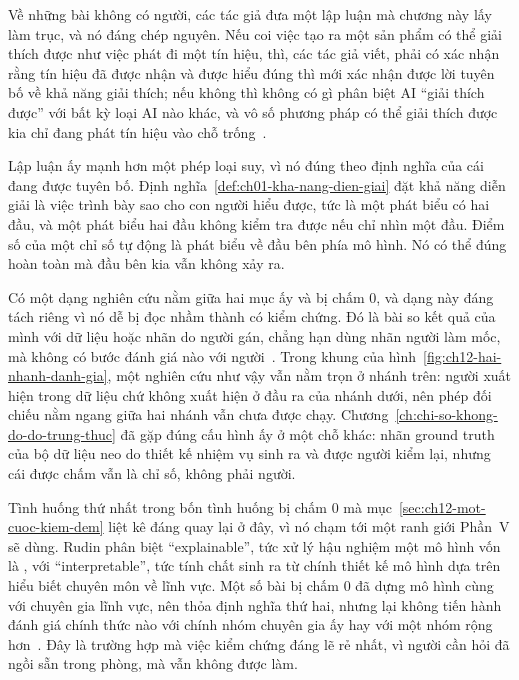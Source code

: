 %
Về những bài không có người, các tác giả đưa một lập luận mà chương này lấy
làm trục, và nó đáng chép nguyên. Nếu coi việc tạo ra một sản phẩm có thể giải
thích được như việc phát đi một tín hiệu, thì, các tác giả viết, phải có
xác nhận rằng tín hiệu đã được nhận và được hiểu đúng thì mới xác nhận được
lời tuyên bố về khả năng giải thích; nếu không thì không có gì phân biệt AI
\enquote{giải thích được} với bất kỳ loại AI nào khác, và vô số phương pháp có
thể giải thích được kia chỉ đang phát tín hiệu vào chỗ
trống~\autocite{p24humangap}.

Lập luận ấy mạnh hơn một phép loại suy, vì nó đúng theo định nghĩa của cái
đang được tuyên bố. Định nghĩa~\ref{def:ch01-kha-nang-dien-giai} đặt khả năng
diễn giải là việc trình bày sao cho con người hiểu được, tức là một phát biểu
có hai đầu, và một phát biểu hai đầu không kiểm tra được nếu chỉ nhìn một đầu.
Điểm số của một chỉ số tự động là phát biểu về đầu bên phía mô hình. Nó có thể
đúng hoàn toàn mà đầu bên kia vẫn không xảy ra.

%
Có một dạng nghiên cứu nằm giữa hai mục ấy và bị chấm 0, và dạng này đáng tách
riêng vì nó dễ bị đọc nhầm thành có kiểm chứng. Đó là bài so kết quả của mình
với dữ liệu hoặc nhãn do người gán, chẳng hạn dùng nhãn người làm mốc, mà
không có bước đánh giá nào với người~\autocite{p24humangap}. Trong khung của
hình~\ref{fig:ch12-hai-nhanh-danh-gia}, một nghiên cứu như vậy vẫn nằm trọn ở
nhánh trên: người xuất hiện trong dữ liệu chứ không xuất hiện ở đầu ra của
nhánh dưới, nên phép đối chiếu nằm ngang giữa hai nhánh vẫn chưa được chạy.
Chương~\ref{ch:chi-so-khong-do-do-trung-thuc} đã gặp đúng cấu hình ấy ở một
chỗ khác: nhãn ground truth của bộ dữ liệu neo do thiết kế nhiệm vụ sinh ra và
được người kiểm lại, nhưng cái được chấm vẫn là chỉ số, không phải người.

Tình huống thứ nhất trong bốn tình huống bị chấm 0 mà
mục~\ref{sec:ch12-mot-cuoc-kiem-dem} liệt kê đáng quay lại ở đây, vì nó chạm
tới một ranh giới Phần~V sẽ dùng. Rudin phân biệt \enquote{explainable}, tức xử lý hậu
nghiệm một mô hình vốn là , với \enquote{interpretable},
tức tính chất sinh ra từ chính thiết kế mô hình dựa trên hiểu biết chuyên môn
về lĩnh vực. Một số bài bị chấm 0 đã dựng mô hình cùng với chuyên gia lĩnh
vực, nên thỏa định nghĩa thứ hai, nhưng lại không tiến hành đánh giá chính
thức nào với chính nhóm chuyên gia ấy hay với một nhóm rộng
hơn~\autocite{p24humangap}. Đây là trường hợp mà việc kiểm chứng đáng lẽ rẻ
nhất, vì người cần hỏi đã ngồi sẵn trong phòng, mà vẫn không được làm.

